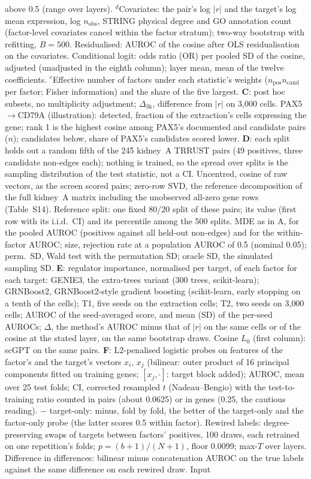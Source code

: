 \begin{longtable}
above 0.5 (range over layers). $^{d}$Covariates: the pair's log $|r|$ and the target's log mean expression, log $n_{\mathrm{obs}}$, STRING physical degree and GO annotation count (factor-level covariates cancel within the factor stratum); two-way bootstrap with refitting, $B = 500$. Residualised: AUROC of the cosine after OLS residualisation on the covariates. Conditional logit: odds ratio (OR) per pooled SD of the cosine, adjusted (unadjusted in the eighth column); layer mean, mean of the twelve coefficients. $^{e}$Effective number of factors under each statistic's weights ($n_{\mathrm{pos}} n_{\mathrm{cand}}$ per factor; Fisher information) and the share of the five largest. \textbf{C}: post hoc subsets, no multiplicity adjustment; $\Delta_{\mathrm{3k}}$, difference from $|r|$ on 3{,}000 cells. PAX5$\to$CD79A (illustration): detected, fraction of the extraction's cells expressing the gene; rank 1 is the highest cosine among PAX5's documented and candidate pairs ($n$); candidates below, share of PAX5's candidates scored lower. \textbf{D}: each split holds out a random fifth of the 245 kidney~A TRRUST pairs (49 positives, three candidate non-edges each); nothing is trained, so the spread over splits is the sampling distribution of the test statistic, not a CI. Uncentred, cosine of raw vectors, as the screen scored pairs; zero-row SVD, the reference decomposition of the full kidney~A matrix including the unobserved all-zero gene rows (Table~S14). Reference split: one fixed 80/20 split of these pairs; its value (first row with its i.i.d.\ CI) and its percentile among the 500 splits. MDE as in A, for the pooled AUROC (positives against all held-out non-edges) and for the within-factor AUROC; size, rejection rate at a population AUROC of 0.5 (nominal 0.05); perm.\ SD, Wald test with the permutation SD; oracle SD, the simulated sampling SD. \textbf{E}: regulator importance, normalised per target, of each factor for each target: GENIE3, the extra-trees variant (300 trees, scikit-learn); GRNBoost2, GRNBoost2-style gradient boosting (scikit-learn, early stopping on a tenth of the cells); T1, five seeds on the extraction cells; T2, two seeds on 3{,}000 cells; AUROC of the seed-averaged score, and mean (SD) of the per-seed AUROCs; $\Delta$, the method's AUROC minus that of $|r|$ on the same cells or of the cosine at the stated layer, on the same bootstrap draws. Cosine $L_0$ (first column): scGPT on the same pairs. \textbf{F}: L2-penalised logistic probes on features of the factor's and the target's vectors $x_i$, $x_j$ (bilinear: outer product of 16 principal components fitted on training genes; $[x_j, \cdot]$: target block added); AUROC, mean over 25 test folds; CI, corrected resampled $t$ (Nadeau--Bengio) with the test-to-training ratio counted in pairs (about 0.0625) or in genes (0.25, the cautious reading). $-$ target-only: minus, fold by fold, the better of the target-only and the factor-only probe (the latter scores 0.5 within factor). Rewired labels: degree-preserving swaps of targets between factors' positives, 100 draws, each retrained on one repetition's folds; $p = (b + 1)/(N + 1)$, floor 0.0099; max-$T$ over layers. Difference in differences: bilinear minus concatenation AUROC on the true labels against the same difference on each rewired draw. Input 
\end{longtable}
